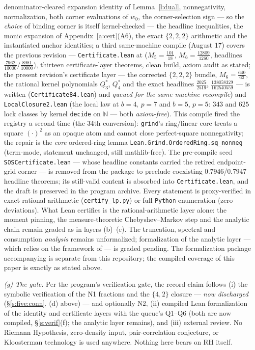 \documentclass[11pt]{article}
\numberwithin{equation}{section}
\theoremstyle{definition}
\theoremstyle{remark}
\begin{document}
denominator-cleared expansion identity of Lemma~\ref{l:dual},
nonnegativity, normalization, both corner evaluations of $w_0$,
the corner-selection sign --- so the \emph{choice} of
binding corner is itself kernel-checked --- the headline
inequalities, the monic expansion of Appendix~\ref{a:cert}(A6),
the exact $\{2,2,2\}$ arithmetic and the instantiated anchor
identities; a third same-machine compile (August 17) covers
the previous revision --- \texttt{Certificate.lean} at
($M_5=\tfrac{101}{18}$, $M_6=\tfrac{12809}{1260}$,
headlines $\tfrac{7962}{10000}$/$\tfrac{8981}{10000}$),
thirteen certificate-layer theorems, clean build, axiom audit
as stated; the present revision's certificate layer ---
the corrected $\{2,2,2\}$ bundle, $M_6=\tfrac{640}{63}$, the
rational kernel polynomials $Q_3^*$, $Q_4^*$ and the exact
headlines $\tfrac{2025}{2519}$, $\tfrac{138058329}{162540559}$
--- is written (\texttt{Certificate84.lean}) and \emph{queued
for the same-machine recompile}) and
\texttt{LocalClosure2.lean} (the local law at $b=4$, $p=7$ and
$b=5$, $p=5$: $343$ and $625$ lock classes by kernel
\texttt{decide} on $\mathbb N$ --- both \emph{axiom-free}).
This compile fired the registry a second time (the $34$th
conversion): \texttt{grind}'s ring/linear core treats a square
$(\cdot)^2$ as an opaque atom and cannot close perfect-square
nonnegativity; the repair is the \emph{core} ordered-ring lemma
\texttt{Lean.Grind.OrderedRing.sq\_nonneg} (term-mode,
statement unchanged, still mathlib-free). The pre-compile seed
\texttt{SOSCertificate.lean} --- whose headline constants
carried the retired endpoint-grid corner --- is removed from the
package to preclude coexisting $0.7946$/$0.7947$ headline
theorems; its still-valid content is absorbed into
\texttt{Certificate.lean}, and the draft is preserved in the
program archive. Every statement is proxy-verified in
exact rational arithmetic (\texttt{certify\_lp.py}) or full
\texttt{Python} enumeration (zero deviations). What Lean
certifies is the rational-arithmetic layer alone: the moment
pinning, the measure-theoretic Chebyshev--Markov step and the
analytic chain remain graded as in layers (b)--(e). The truncation, spectral and consumption
\emph{analysis} remains unformalized; formalization of the
analytic layer --- which relies on the framework of
\cite{C26} --- is graded pending. The formalization package
accompanying \cite{C26} is separate from this repository; the
compiled coverage of this paper is exactly as stated above.

\emph{(g) The gate.} Per the program's verification gate, the
record claim follows (i) the symbolic verification of the
N1 fractions and the $\{4,2\}$ closure --- \emph{now
discharged} (\S\ref{s:five:conn}, (d) above) --- and
optionally N2, (ii) compiled Lean formalization of the identity
and certificate layers with the queue's Q1--Q6 (both are now
compiled, \S\ref{s:verif}(f); the analytic layer remains), and
(iii)
external review. No Riemann Hypothesis, zero-density input,
pair-correlation conjecture, or Kloosterman technology is used
anywhere. Nothing here bears on RH itself.
\end{document}
